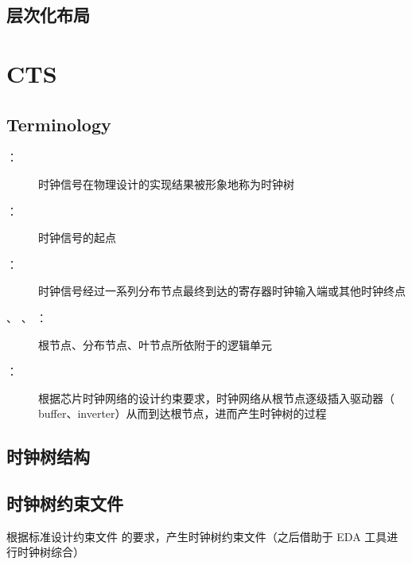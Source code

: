 \documentclass[letterpaper,10pt,english]{sphinxmanual}
\begin{document}
\section{层次化布局}
\label{\detokenize{chapter6/_u5c42_u6b21_u5316_u5e03_u5c40:id1}}\label{\detokenize{chapter6/_u5c42_u6b21_u5316_u5e03_u5c40::doc}}

\chapter{CTS}
\label{\detokenize{chapter7/index:cts}}\label{\detokenize{chapter7/index::doc}}

\section{Terminology}
\label{\detokenize{chapter7/Terminology:terminology}}\label{\detokenize{chapter7/Terminology::doc}}\begin{description}
\item[{ ：}] \leavevmode
\sphinxAtStartPar
时钟信号在物理设计的实现结果被形象地称为时钟树

\item[{ ：}] \leavevmode
\sphinxAtStartPar
时钟信号的起点

\item[{ ：}] \leavevmode
\sphinxAtStartPar
时钟信号经过一系列分布节点最终到达的寄存器时钟输入端或其他时钟终点

\item[{ 、  、  ：}] \leavevmode
\sphinxAtStartPar
根节点、分布节点、叶节点所依附于的逻辑单元

\item[{ ：}] \leavevmode
\sphinxAtStartPar
根据芯片时钟网络的设计约束要求，时钟网络从根节点逐级插入驱动器（ buffer、inverter）从而到达根节点，进而产生时钟树的过程

\end{description}


\section{时钟树结构}
\label{\detokenize{chapter7/_u65f6_u949f_u6811_u7ed3_u6784:id1}}\label{\detokenize{chapter7/_u65f6_u949f_u6811_u7ed3_u6784::doc}}

\section{时钟树约束文件}
\label{\detokenize{chapter7/_u65f6_u949f_u6811_u7ea6_u675f_u6587_u4ef6:id1}}\label{\detokenize{chapter7/_u65f6_u949f_u6811_u7ea6_u675f_u6587_u4ef6::doc}}
\sphinxAtStartPar
根据标准设计约束文件  的要求，产生时钟树约束文件（之后借助于 EDA 工具进行时钟树综合）
\end{document}
